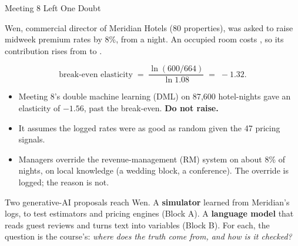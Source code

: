\documentclass[aspectratio=169, 11pt, handout]{beamer}
\begin{document}
\begin{frame}{Meeting 8 Left One Doubt}

Wen, commercial director of Meridian Hotels (80 properties), was asked to raise midweek premium rates by 8\%, from  a night. An occupied room costs , so its contribution rises from  to .

\[
\text{break-even elasticity} \;=\; \frac{\ln(600/664)}{\ln 1.08} \;=\; -1.32 .
\]

\begin{itemize}
  \item Meeting 8's double machine learning (DML) on 87{,}600 hotel-nights gave an elasticity of $-1.56$, past the break-even. \textbf{Do not raise.}
  \item It assumes the logged rates were as good as random given the 47 pricing signals.
  \item Managers override the revenue-management (RM) system on about 8\% of nights, on local knowledge (a wedding block, a conference). The override is logged; the reason is not.
\end{itemize}

\medskip

Two generative-AI proposals reach Wen. A \textbf{simulator} learned from Meridian's logs, to test estimators and pricing engines (Block A). A \textbf{language model} that reads guest reviews and turns text into variables (Block B). For each, the question is the course's: \emph{where does the truth come from, and how is it checked?}
\end{frame}
\end{document}
